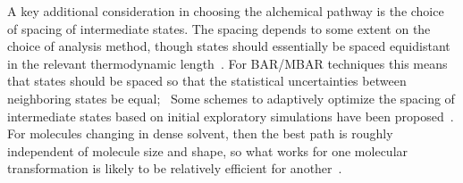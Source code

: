 \documentclass[9pt,bestpractices]{livecoms}
\begin{document}
A key additional consideration in choosing the alchemical pathway is the choice of spacing of intermediate states.
The spacing depends to some extent on the choice of analysis method, though states should essentially be spaced equidistant in the relevant thermodynamic length~\cite{crooks2007measuringa, sivak2012thermodynamic}.
For BAR/MBAR techniques this means that states should be spaced so that the statistical uncertainties between neighboring states be equal;~\cite{pham2012optimal, shenfeld2009minimizing}
Some schemes to adaptively optimize the spacing of intermediate states based on initial exploratory simulations have been proposed~\cite{hayes2017adaptive}. For molecules changing in dense solvent, then the best path is roughly independent of molecule size and shape, so what works for one molecular transformation is likely to be relatively efficient for another~\cite{monroe2014converging}.
\end{document}
